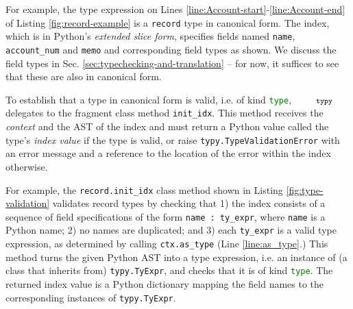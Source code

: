 \documentclass[10pt]{sigplanconf}
\newcommand{\typy}{\texttt{\footnotesize typy}}
\newcommand{\lip}[1]{\lstinline[language=Python,basicstyle=\ttfamily\footnotesize,morekeywords={with},deletendkeywords={tuple,buffer,map}]{#1}}
\begin{document}
For example, the type expression on Lines \ref{line:Account-start}-\ref{line:Account-end} of Listing \ref{fig:record-example} is a \lip{record} type in canonical form. The index, which is in Python's \emph{extended slice form}, specifies fields named \lip{name}, \lip{account_num} and \lip{memo} and  corresponding field types as shown. We discuss the field types in Sec. \ref{sec:typechecking-and-translation} -- for now, it suffices to see that these are also in canonical form.

To establish that a type in canonical form is valid, i.e. of kind \lip{type}, $\typy$ delegates to the fragment class method \lip{init_idx}. This method receives  the \emph{context} and the AST of the index and must return a Python value called the type's \emph{index value} if the type is valid, or raise \lip{typy.TypeValidationError} with an error message and a reference to the location of the error within the index otherwise. %

For example, the \lip{record.init_idx} class method shown in Listing \ref{fig:type-validation} validates record types by checking that 1) the index consists of a  sequence of field specifications of the form \lip{name : ty_expr}, where \lip{name} is a Python name; 2) no names are duplicated; and 3) each \lip{ty_expr} is a valid type expression, as determined by calling \lip{ctx.as_type} (Line \ref{line:as_type}.) This method turns the given Python AST into a type expression, i.e. an instance of (a class that inherits from) \lip{typy.TyExpr}, and checks that it is of kind \lip{type}. The returned index value is a Python dictionary mapping the field names to the corresponding instances of \lip{typy.TyExpr}.

\end{document}
